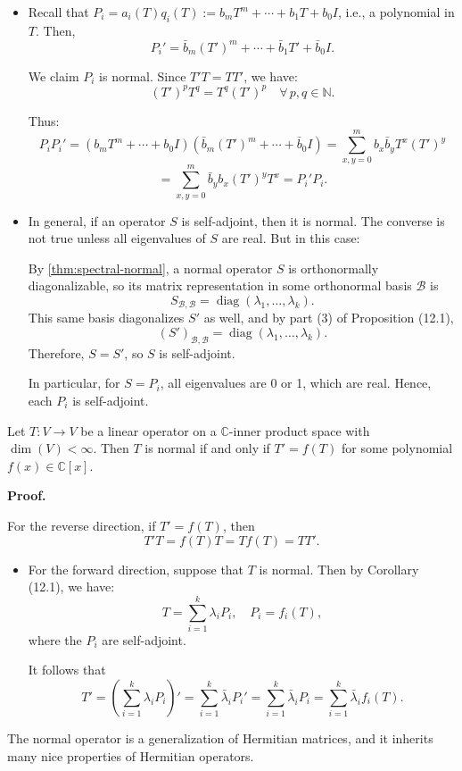 \begin{itemize}
\item Recall that \( P_i = a_i(T) q_i(T) := b_m T^m + \cdots + b_1 T + b_0 I \), i.e., a polynomial in \( T \). Then,
\[
P_i' = \bar{b}_m (T')^m + \cdots + \bar{b}_1 T' + \bar{b}_0 I.
\]

We claim \( P_i \) is normal. Since \( T'T = TT' \), we have:
\[
(T')^p T^q = T^q (T')^p \quad \forall\, p, q \in \mathbb{N}.
\]

Thus:
\[
P_i P_i' = \left( b_m T^m + \cdots + b_0 I \right) \left( \bar{b}_m (T')^m + \cdots + \bar{b}_0 I \right)
= \sum_{x,y=0}^m b_x \bar{b}_y T^x (T')^y
\]
\[
= \sum_{x,y=0}^m \bar{b}_y b_x (T')^y T^x = P_i' P_i.
\]

\item In general, if an operator \( S \) is self-adjoint, then it is normal. The converse is not true unless all eigenvalues of \( S \) are real. But in this case:

By \autoref{thm:spectral-normal}, a normal operator \( S \) is orthonormally diagonalizable, so its matrix representation in some orthonormal basis \( \mathcal{B} \) is
\[
S_{\mathcal{B}, \mathcal{B}} = \operatorname{diag}(\lambda_1, \ldots, \lambda_k).
\]
This same basis diagonalizes \( S' \) as well, and by part (3) of Proposition (12.1),
\[
(S')_{\mathcal{B}, \mathcal{B}} = \operatorname{diag}(\lambda_1, \ldots, \lambda_k).
\]
Therefore, \( S = S' \), so \( S \) is self-adjoint.

In particular, for \( S = P_i \), all eigenvalues are 0 or 1, which are real. Hence, each \( P_i \) is self-adjoint.
\end{itemize}

\begin{corollary}
Let \( T : V \to V \) be a linear operator on a \( \mathbb{C} \)-inner product space with \( \dim(V) < \infty \). Then \( T \) is normal if and only if \( T' = f(T) \) for some polynomial \( f(x) \in \mathbb{C}[x] \).
\end{corollary}

\textbf{Proof.} 

For the reverse direction, if \( T' = f(T) \), then
\[
T'T = f(T)T = Tf(T) = TT'.
\]

\begin{itemize}
\item For the forward direction, suppose that \( T \) is normal. Then by Corollary (12.1), we have:
\[
T = \sum_{i=1}^k \lambda_i P_i, \quad P_i = f_i(T),
\]
where the \( P_i \) are self-adjoint.

\medskip

It follows that
\[
T' = \left( \sum_{i=1}^k \lambda_i P_i \right)' 
= \sum_{i=1}^k \bar{\lambda}_i P_i' 
= \sum_{i=1}^k \bar{\lambda}_i P_i 
= \sum_{i=1}^k \bar{\lambda}_i f_i(T).
\]
\end{itemize}

\begin{remark}
The normal operator is a generalization of Hermitian matrices, and it inherits many nice properties of Hermitian operators.
\end{remark}
